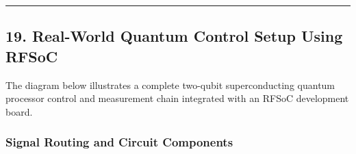\documentclass[
]{article}
\begin{document}
\begin{center}\rule{0.5\linewidth}{0.5pt}\end{center}

\subsection{19. Real-World Quantum Control Setup Using
RFSoC}\label{real-world-quantum-control-setup-using-rfsoc}

The diagram below illustrates a complete two-qubit superconducting
quantum processor control and measurement chain integrated with an RFSoC
development board.

\subsubsection{Signal Routing and Circuit
Components}\label{signal-routing-and-circuit-components}
\end{document}
